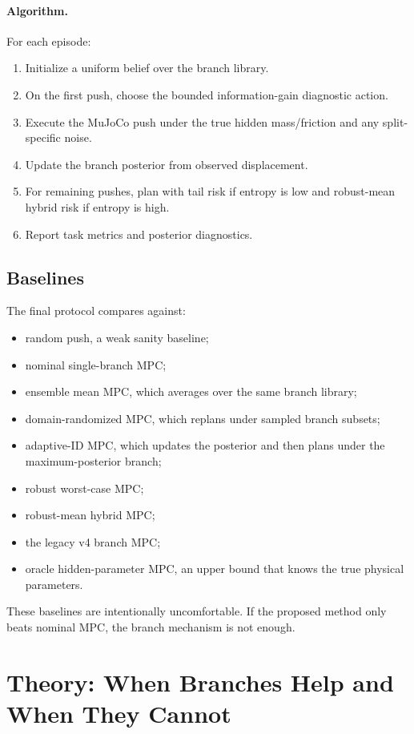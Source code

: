 \documentclass{article}
\begin{document}
\paragraph{Algorithm.}
For each episode:
\begin{enumerate}[leftmargin=1.4em]
  \item Initialize a uniform belief over the branch library.
  \item On the first push, choose the bounded information-gain diagnostic action.
  \item Execute the MuJoCo push under the true hidden mass/friction and any split-specific noise.
  \item Update the branch posterior from observed displacement.
  \item For remaining pushes, plan with tail risk if entropy is low and robust-mean hybrid risk if entropy is high.
  \item Report task metrics and posterior diagnostics.
\end{enumerate}

\subsection{Baselines}

The final protocol compares against:
\begin{itemize}[leftmargin=1.4em]
  \item random push, a weak sanity baseline;
  \item nominal single-branch MPC;
  \item ensemble mean MPC, which averages over the same branch library;
  \item domain-randomized MPC, which replans under sampled branch subsets;
  \item adaptive-ID MPC, which updates the posterior and then plans under the maximum-posterior branch;
  \item robust worst-case MPC;
  \item robust-mean hybrid MPC;
  \item the legacy v4 branch MPC;
  \item oracle hidden-parameter MPC, an upper bound that knows the true physical parameters.
\end{itemize}
These baselines are intentionally uncomfortable.  If the proposed method only beats nominal MPC, the branch mechanism is not enough.

\section{Theory: When Branches Help and When They Cannot}
\end{document}
